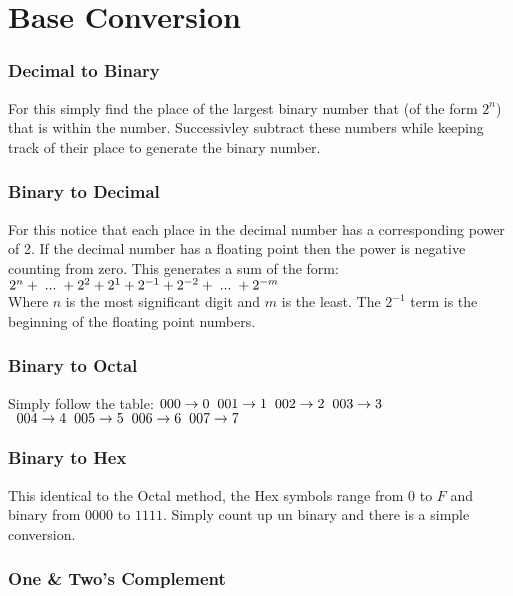 \section{Base Conversion}
\subsubsection*{Decimal to Binary}
For this simply find the place of the largest binary number that (of the form $2^n$)
that is within the number. Successivley subtract these numbers while keeping track of their
place to generate the binary number.

\subsubsection*{Binary to Decimal}
For this notice that each place in the decimal number has a
corresponding power of 2. If the decimal number has a floating
point then the power is negative counting from zero. This generates a
sum of the form:\\
$ 2^{n} + \hspace{1mm} ... \hspace{1mm} + 2^2 + 2^1 + 2^{-1} + 2^{-2} + \hspace{1mm} ... \hspace{1mm} + 2^{-m} $\\
Where $n$ is the most significant digit and $m$ is the least. The $2^{-1}$ term
is the beginning of the floating point numbers.

\subsubsection*{Binary to Octal}
Simply follow the table:
$ 000 \rightarrow 0 \hspace{2mm} 001 \rightarrow 1 \hspace{2mm} 002 \rightarrow 2 \hspace{2mm} 003 \rightarrow 3 $
$ \hspace{2mm} 004 \rightarrow 4 \hspace{2mm} 005 \rightarrow 5 \hspace{2mm} 006 \rightarrow 6 \hspace{2mm} 007 \rightarrow 7 $\\

\subsubsection*{Binary to Hex}
This identical to the Octal method, the Hex symbols range from $0$ to $F$ and binary
from $0000$ to $1111$. Simply count up un binary and there is a simple conversion.

\subsubsection*{One \& Two's Complement}
